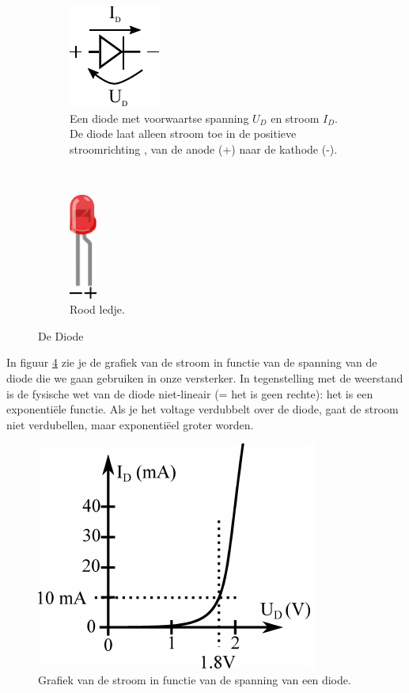 \documentclass{article}
\begin{document}
			\begin{figure}[htbp]
			\centering
				\begin{subfigure}[b]{0.45\linewidth}
					\centering
					\includegraphics{diode}
					\caption{Een diode met voorwaartse spanning $U_D$ en stroom $I_D$. De diode laat alleen stroom toe in de  positieve stroomrichting , van de anode (+) naar de kathode (-).}
					\label{fig:diode}
				\end{subfigure}
				~
				\begin{subfigure}[b]{0.45\linewidth}
					\centering
				\includegraphics[width=0.1\textwidth]{led}
				\caption{Rood ledje.}
				\label{fig:led}
				\end{subfigure}
				\caption{De Diode}
			\end{figure}

			In figuur \ref{fig:diode_grafiek} zie je de grafiek van de stroom in functie van de spanning van de diode die we gaan gebruiken in onze versterker. In tegenstelling met de weerstand is de fysische wet van de diode niet-lineair (= het is geen rechte): het is een exponenti\"ele functie. Als je het voltage verdubbelt over de diode, gaat de stroom niet verdubellen, maar exponenti\"eel groter worden.
				\begin{figure}[htbp]
					\centering
					\includegraphics{diode_grafiek}
					\caption{Grafiek van de stroom in functie van de spanning van een diode.}
					\label{fig:diode_grafiek}
				\end{figure}
				
\end{document}
